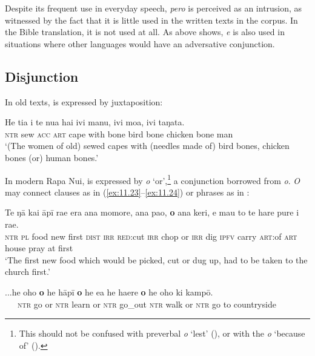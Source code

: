 Despite its frequent use in everyday speech, \textit{pero} is perceived as an intrusion, as witnessed by the fact that it is little used in the written texts in the corpus. In the Bible translation, it is not used at all. As  above shows, \textit{{\ꞌ}e} is also used in situations where other languages would have an adversative conjunction.

\subsection{Disjunction}\label{sec:11.2.2}

In old texts,  is expressed by juxtaposition:

\ea\label{ex:11.22}
\gll He tia i te nua hai ivi manu, ivi moa, ivi taŋata.\\
\textsc{ntr} sew \textsc{acc} \textsc{art} cape with bone bird bone chicken bone man\\

\glt
‘(The women of old) sewed capes with (needles made of) bird bones, chicken bones (or) human bones.’ \textstyleExampleref{[Ley-5-04.013]}
\z

In modern Rapa Nui,  is expressed by \textit{{\ꞌ}o} ‘or’,\footnote{\label{fn:505}This  should not be confused with preverbal \textit{{\ꞌ}o} ‘lest’ (), or with the  \textit{{\ꞌ}o} ‘because of’ ().} a conjunction borrowed from  \textit{o}. \textit{{\ꞌ}O} may connect clauses as in (\ref{ex:11.23}–\ref{ex:11.24}) or phrases as in :

\ea\label{ex:11.23}
\gll Te ŋā kai {\ꞌ}āpī ra{\ꞌ}e era ana momore, ana pa{\ꞌ}o, \textbf{{\ꞌ}o} ana keri, e ma{\ꞌ}u  to te hare pure {\ꞌ}i ra{\ꞌ}e.\\
\textsc{ntr} \textsc{pl} food new first \textsc{dist} \textsc{irr} \textsc{red}:cut \textsc{irr} chop or \textsc{irr} dig \textsc{ipfv} carry  \textsc{art}:of \textsc{art} house pray at first\\

\glt 
‘The first new food which would be picked, cut or dug up, had to be taken to the church first.’ \textstyleExampleref{[R539-3.150]}
\z

\ea\label{ex:11.24}
\gll ...he oho \textbf{{\ꞌ}o} he hāpī \textbf{{\ꞌ}o} he e{\ꞌ}a he ha{\ꞌ}ere \textbf{{\ꞌ}o} he oho ki kampō.\\
~~~\textsc{ntr} go or \textsc{ntr} learn or \textsc{ntr} go\_out \textsc{ntr} walk or \textsc{ntr} go to countryside\\

